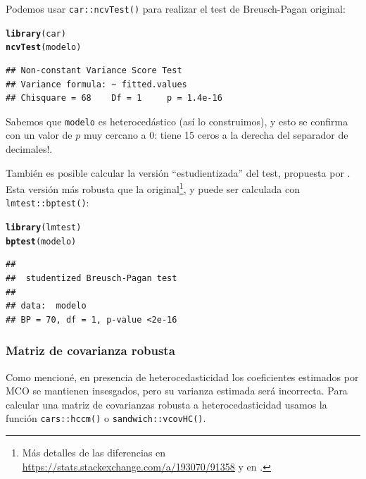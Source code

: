 \documentclass{article}\usepackage[]{graphicx}\usepackage[]{color}
\makeatletter
\newcommand{\hlstd}[1]{\textcolor[rgb]{0.345,0.345,0.345}{#1}}%
\newcommand{\hlkwd}[1]{\textcolor[rgb]{0.737,0.353,0.396}{\textbf{#1}}}%
\newenvironment{kframe}{%
 \def\at@end@of@kframe{}%
 \ifinner\ifhmode%
  \def\at@end@of@kframe{\end{minipage}}%
  \begin{minipage}{\columnwidth}%
 \fi\fi%
 \def\FrameCommand##1{\hskip\@totalleftmargin \hskip-\fboxsep
 \colorbox{shadecolor}{##1}\hskip-\fboxsep
     \hskip-\linewidth \hskip-\@totalleftmargin \hskip\columnwidth}%
 \MakeFramed {\advance\hsize-\width
   \@totalleftmargin\z@ \linewidth\hsize
   \@setminipage}}%
 {\par\unskip\endMakeFramed%
 \at@end@of@kframe}
\newenvironment{knitrout}{}{} %
\makeatother
\begin{document}
Podemos usar \verb|car::ncvTest()| para realizar el test de Breusch-Pagan original:

\begin{knitrout}
\color{fgcolor}\begin{kframe}
\begin{alltt}
\hlkwd{library}\hlstd{(car)}
\hlkwd{ncvTest}\hlstd{(modelo)}
\end{alltt}
\begin{verbatim}
## Non-constant Variance Score Test 
## Variance formula: ~ fitted.values 
## Chisquare = 68    Df = 1     p = 1.4e-16
\end{verbatim}
\end{kframe}
\end{knitrout}

Sabemos que \verb|modelo| es heterocedástico (así lo construimos), y esto se confirma con un valor de $p$ muy cercano a 0: tiene 15 ceros a la derecha del separador de decimales!.

También es posible calcular la versión ``estudientizada'' del test, propuesta por \textcite{koenker_note_1981}. Esta versión más robusta que la original\footnote{Más detalles de las diferencias en \url{https://stats.stackexchange.com/a/193070/91358} y en \textcite{koenker_note_1981}.}, y puede ser calculada con \verb|lmtest::bptest()|:

\begin{knitrout}
\color{fgcolor}\begin{kframe}
\begin{alltt}
\hlkwd{library}\hlstd{(lmtest)}
\hlkwd{bptest}\hlstd{(modelo)}
\end{alltt}
\begin{verbatim}
## 
## 	studentized Breusch-Pagan test
## 
## data:  modelo
## BP = 70, df = 1, p-value <2e-16
\end{verbatim}
\end{kframe}
\end{knitrout}


\subsubsection{Matriz de covarianza robusta}
\label{sec:matriz_cov_robusta}

Como mencioné, en presencia de heterocedasticidad los coeficientes estimados por MCO se mantienen insesgados, pero su varianza estimada será incorrecta. Para calcular una matriz de covarianzas robusta a heterocedasticidad usamos la función \verb|cars::hccm()| o \verb|sandwich::vcovHC()|.
\end{document}
